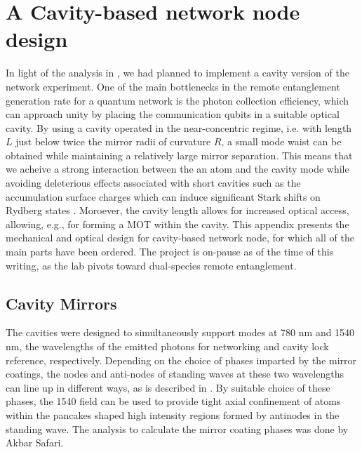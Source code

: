 \chapter{A Cavity-based network node design}\label{ch:cavitynode}

In light of the analysis in \cite{Young2022}, we had planned to implement a cavity version of the network experiment. One of the main bottlenecks in the remote entanglement generation rate for a quantum network is the photon collection efficiency, which can approach unity by placing the communication qubits in a suitable optical cavity. By using a cavity operated in the near-concentric regime, i.e. with length $L$ just below twice the mirror radii of curvature $R$, a small mode waist can be obtained while maintaining a relatively large mirror separation. This means that we acheive a strong interaction between the an atom and the cavity mode while avoiding deleterious effects associated with short cavities such as the accumulation surface charges which can induce significant Stark shifts on Rydberg states \cite{Bohorquez2023}. Moroever, the cavity length allows for increased optical access, allowing, e.g., for forming a MOT within the cavity. This appendix presents the mechanical and optical design for cavity-based network node, for which all of the main parts have been ordered. The project is on-pause as of the time of this writing, as the lab pivots toward dual-species remote entanglement.

\section{Cavity Mirrors}\label{sec:cavmirrors}

The cavities were designed to simultaneously support modes at 780 nm and 1540 nm, the wavelengths of the emitted photons for networking and cavity lock reference, respectively. Depending on the choice of phases imparted by the mirror coatings, the nodes and anti-nodes of standing waves at these two wavelengths can line up in different ways, as is described in \cite{garcia2020overlapping}. By suitable choice of these phases, the 1540 field can be used to provide tight axial confinement of atoms within the pancakes shaped high intensity regions formed by antinodes in the standing wave. The analysis to calculate the mirror coating phases was done by Akbar Safari.

